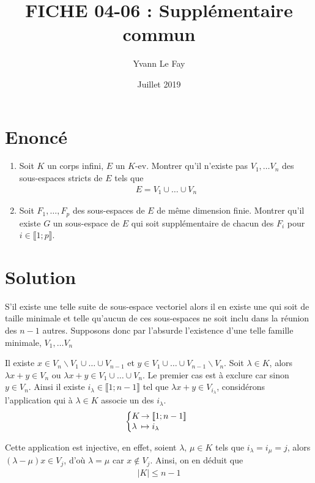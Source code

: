 \documentclass{article}
\begin{document}
\title{FICHE 04-06 : Supplémentaire commun }
\author{Yvann Le Fay}
\date{Juillet 2019}
\maketitle
\section*{Enoncé}
\begin{enumerate}
	\item Soit $K$ un corps infini, $E$ un $K$-ev. Montrer qu'il n'existe pas $V_1,\ldots V_n$ des sous-espaces stricts de $E$ tels que
\begin{align*}
	E = V_1 \cup \ldots \cup V_n
\end{align*}
\item Soit $F_1,\ldots, F_p$ des sous-espaces de $E$ de même dimension finie. Montrer qu'il existe $G$ un sous-espace de $E$ qui soit supplémentaire de chacun des $F_i$ pour $i\in\llbracket 1;p\rrbracket$.
\end{enumerate}
\section*{Solution}
S'il existe une telle suite de sous-espace vectoriel alors il en existe une qui soit de taille minimale et telle qu'aucun de ces sous-espaces ne soit inclu dans la réunion des $n-1$ autres. Supposons donc par l'absurde l'existence d'une telle famille minimale, $V_1, \ldots V_n$

Il existe $x \in V_n\backslash V_1\cup\ldots\cup V_{n-1}$ et $y\in V_1\cup \ldots \cup V_{n-1}\backslash V_n$. Soit $\lambda\in K$, alors $\lambda x + y\in V_n$ ou $\lambda x +y\in V_1\cup\ldots \cup V_n$. Le premier cas est à exclure car sinon $y\in V_n$. Ainsi il existe  $i_{\lambda}\in\llbracket 1;n-1\rrbracket$ tel que $\lambda x + y \in V_{i_{\lambda}}$, considérons l'application qui à $\lambda\in K$ associe un des $i_{\lambda}$. 
\begin{align*}
	\left\{
		\begin{array}{@{}l@{\thinspace}l}
			K &\to \llbracket 1;n-1\rrbracket\\
			\lambda &\mapsto i_{\lambda}
		\end{array}
	\right.
\end{align*}

Cette application est injective, en effet, soient $\lambda,\,\mu\in K$ tels que $i_{\lambda}=i_{\mu} = j$, alors $(\lambda-\mu)x\in V_{j}$, d'où $\lambda = \mu$ car $x\notin V_j$. Ainsi, on en déduit que 
\begin{align*}
	|K|\leq n-1
\end{align*}
\end{document}
